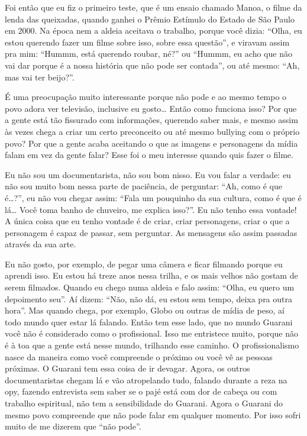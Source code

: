 {{Foi então que eu fiz o primeiro teste, que é um ensaio chamado Manoa, o
filme da lenda das queixadas, quando ganhei o Prêmio Estímulo do Estado
de São Paulo em 2000. Na época nem a aldeia aceitava o trabalho, porque
você dizia: ``Olha, eu estou querendo fazer um filme sobre isso, sobre
essa questão'', e viravam assim pra mim: ``Hummm, está querendo roubar,
né?'' ou ``Hummm, eu acho que não vai dar porque é a nossa história que
não pode ser contada'', ou até mesmo: ``Ah, mas vai ter beijo?''.

É uma preocupação muito interessante porque não pode e ao mesmo tempo o
povo adora ver televisão, inclusive eu gosto\ldots{} Então como funciona
isso? Por que a gente está tão fissurado com informações, querendo
saber mais, e mesmo assim às vezes chega a criar um certo preconceito
ou até mesmo bullying com o próprio povo? Por que a gente acaba
aceitando o que as imagens e personagens da mídia falam em vez da gente
falar? Esse foi o meu interesse quando quis fazer o filme. 

Eu não sou um documentarista, não sou bom nisso. Eu vou falar a verdade:
eu não sou muito bom nessa parte de paciência, de perguntar: ``Ah, como
é que é\ldots{}?'', eu não vou chegar assim: ``Fala um pouquinho da sua
cultura, como é que é lá\ldots{} Você toma banho de chuveiro, me explica
isso?''. Eu não tenho essa vontade! A única coisa que eu tenho vontade é
de criar, criar personagens, criar o que a personagem é capaz de
passar, sem perguntar. As mensagens são assim passadas através da sua
arte. 

Eu não gosto, por exemplo, de pegar uma câmera e ficar filmando porque
eu aprendi isso. Eu estou há treze anos nessa trilha, e os mais velhos
não gostam de serem filmados. Quando eu chego numa aldeia e falo assim:
``Olha, eu quero um depoimento seu''. Aí dizem: ``Não, não dá, eu estou
sem tempo, deixa pra outra hora''. Mas quando chega, por exemplo, Globo
ou outras de mídia de peso, aí todo mundo quer estar lá falando. Então
tem esse lado, que no mundo Guarani você não é considerado como o
profissional. Isso me entristece muito, porque não é à toa que a gente
está nesse mundo, trilhando esse caminho. O profissionalismo nasce da
maneira como você compreende o próximo ou você vê as pessoas próximas.
O Guarani tem essa coisa de ir devagar. Agora, os outros
documentaristas chegam lá e vão atropelando tudo, falando durante a
reza na opy, fazendo entrevista sem saber se o pajé está com dor de
cabeça ou com trabalho espiritual, não tem a sensibilidade do Guarani.
Agora o Guarani do mesmo povo compreende que não pode falar em qualquer
momento. Por isso sofri muito de me dizerem que ``não pode''.

}}
